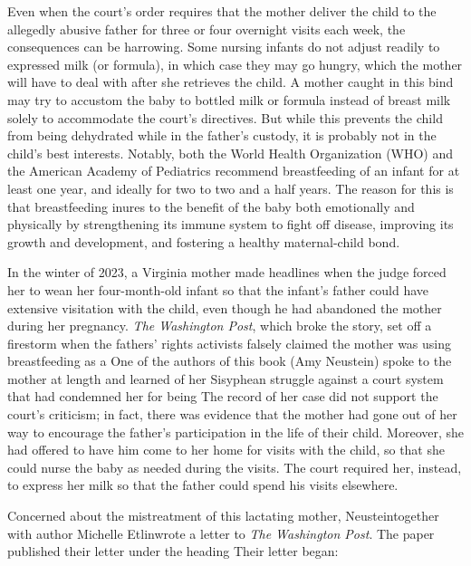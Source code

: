 Even when the court’s order requires  that the mother deliver
the child to the allegedly abusive father for three or four overnight visits
each week, the consequences can be harrowing. Some nursing infants do
not adjust readily to expressed milk (or formula), in which case they may
go hungry, which the mother will have to deal with after she retrieves
the child. A mother caught in this bind may try to accustom the baby
to bottled milk or formula instead of breast milk solely to accommodate
the court’s directives. But while this prevents the child from being 
dehydrated while in the father's custody, it is probably not in the child's best
interests. Notably, both the World Health Organization (WHO) and the
American Academy of Pediatrics recommend breastfeeding of an infant
for at least one year, and ideally for two to two and a half years. 
The reason for this is that breastfeeding inures to the benefit of the baby both emotionally and physically
by strengthening its immune system to fight off disease, improving its
growth and development, and fostering a healthy maternal-child bond. \pfl{}

In the winter of 2023, a Virginia mother made headlines when
the judge forced her to wean her four-month-old infant so that the infant's father could have extensive visitation with the child, even though
he had abandoned the mother during her pregnancy. \textit{The Washington
Post}, which broke the story, set off a firestorm when the fathers' 
rights activists falsely claimed the mother was using breastfeeding as a  One of the authors of this book (Amy Neustein)
spoke to the mother at length and learned of her Sisyphean struggle
against a court system that had condemned her 
for being  The record of her case did not support the court's criticism;
in fact, there was evidence that the mother had gone out of her way to
encourage the father’s participation in the life of their child. Moreover,
she had offered to have him come to her home for visits with the child,
so that she could nurse the baby as needed during the visits. The court
required her, instead, to express her milk so that the father could spend
his visits elsewhere. \pfl{}


Concerned about the mistreatment of this lactating mother,
Neustein\mdash{}together with author Michelle Etlin\mdash{}wrote a letter to 
\textit{The Washington Post}. The paper published their letter under the heading
 Their letter
began: \hspace{1pt} \pfl{}


